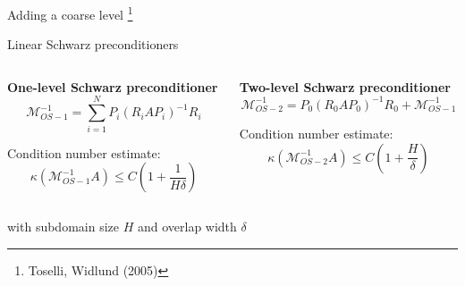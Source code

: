\begin{frame}[noframenumbering]{Adding a coarse level \footnote{\tiny Toselli, Widlund (2005)}}

	{\Large Linear Schwarz preconditioners}
	\vspace*{4mm}
	\begin{columns}
		\begin{column}{0.5\textwidth}
			{\bf One-level Schwarz preconditioner}
			\begin{equation*}
				\mathcal{M}^{-1}_{OS-1}=\sum_{i=1}^{N}P_i(R_iAP_i)^{-1}R_i
			\end{equation*}
			\begin{block}{\normalsize Condition number estimate:}
				\begin{equation*}
					\kappa(\mathcal{M}^{-1}_{OS-1}A)\leq C(1+\frac{1}{H\delta})
				\end{equation*}
			\end{block}
		\end{column}
		\begin{column}{0.5\textwidth}
			{\bf Two-level Schwarz preconditioner}
			\vspace*{3mm}
			\begin{equation*}
				\mathcal{M}^{-1}_{OS-2}=P_0(R_0AP_0)^{-1}R_0 + \mathcal{M}^{-1}_{OS-1}
			\end{equation*}
			\begin{block}{\normalsize Condition number estimate:}
				\begin{equation*}
					\kappa(\mathcal{M}^{-1}_{OS-2}A)\leq C(1+\frac{H}{\delta})
				\end{equation*}
			\end{block}
		\end{column}
	\end{columns}
	\vspace*{4mm}
	\centering
	with subdomain size $H$ and overlap width $\delta$
\end{frame}


